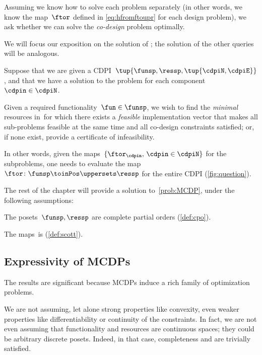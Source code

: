 Assuming we know how to solve each problem separately (in other words, we know the map~$\ftor$ defined in \cref{eq:hfromftoupr} for each design problem), we ask whether we can solve
the \emph{co-design} problem optimally.

We will focus our exposition on the solution of \FixFunMinRes; the solution of the other queries will be analogous.


\begin{problem}
    \label{prob:MCDP}
    Suppose that we are given a CDPI~$\tup{ \funsp,\ressp,\tup{ \cdpiN,\cdpiE} }$, and
    that we have a solution to the \FixFunMinRes problem for each component~$\cdpin\in\cdpiN$.

    Given a required functionality~$\fun\in\funsp$, we wish to find
    the \emph{minimal} resources in~\ressp for which there exists
    a \emph{feasible} implementation vector that makes all sub-problems feasible
    at the same time and all co-design constraints satisfied; or, if
    none exist, provide a certificate of infeasibility.
\end{problem}
In other words, given the maps~$\{\ftor_{\cdpin},\,\cdpin\in\cdpiN\}$
for the subproblems, one needs to evaluate  the map~$\ftor\colon\funsp \toinPos \uppersets \ressp$
for the entire CDPI (\cref{fig:question}).


The rest of the chapter will provide a solution to~\cref{prob:MCDP},
under the following assumptions:

\begin{compactenum}
    \item The posets~$\funsp,\ressp$ are complete partial orders (\cref{def:cpo}).
    \item The maps~\ftor is \scottcontinuous (\cref{def:scott}).
\end{compactenum}

\subsection{Expressivity of MCDPs}
The results are significant because MCDPs induce a rich family of
optimization problems.

We are not assuming, let alone strong properties like convexity, even
weaker properties like differentiability or continuity of the constraints.
In fact, we are not even assuming that functionality and resources
are continuous spaces; they could be arbitrary discrete posets.
Indeed, in that case, completeness and \scottcontinuity are trivially satisfied.

